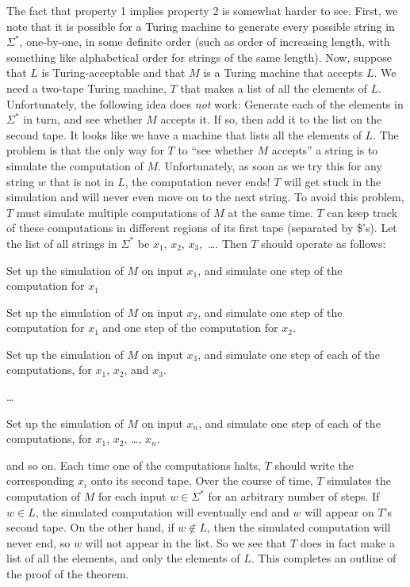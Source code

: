 The fact that property 1 implies property
2 is somewhat harder to see.  First, we note that it is possible for a Turing
machine to generate every possible string in $\Sigma^*$, one-by-one,
in some definite order (such
as order of increasing length, with something like alphabetical order
for strings of the same length).  Now, suppose that $L$ is Turing-acceptable
and that $M$ is a Turing machine that accepts $L$.  We need a two-tape
Turing machine, $T$ that makes a list of all the elements of $L$.
Unfortunately, the following idea does \textit{not} work:  Generate each
of the elements in $\Sigma^*$ in turn, and see whether $M$ accepts it.
If so, then add it to the list on the second tape.  It looks like we have a machine that
lists all the elements of $L$.  The problem is that the only way for $T$ to
``see whether $M$ accepts'' a string is to simulate the computation of $M$.
Unfortunately, as soon as we try this for any string $w$ that is not in $L$,
the computation never ends!  $T$ will get stuck in the simulation and will
never even move on to the next string.  To avoid this problem, $T$ must simulate
multiple computations of $M$ at the same time.  $T$ can keep track of
these computations in different regions of its first tape (separated by \$'s).
Let the list of all strings in $\Sigma^*$ be $x_1$, $x_2$, $x_3$,~\dots. Then $T$ should
operate as follows:

\smallskip
{}Set up the simulation of $M$ on input $x_1$, and simulate one 
          step of the computation for $x_1$

\smallskip
{}Set up the simulation of $M$ on input $x_2$, and simulate one 
          step of the computation for $x_1$ and one step of the computation for $x_2$.

\smallskip
{}Set up the simulation of $M$ on input $x_3$, and simulate one 
          step of each of the computations, for $x_1$, $x_2$, and $x_3$.

\smallskip
\IItem{}\dots
          
\smallskip
{}Set up the simulation of $M$ on input $x_n$, and simulate one 
          step of each of the computations, for $x_1$, $x_2$, \dots, $x_n$.

\noindent and so on.  Each time one of the computations halts, $T$ should
write the corresponding $x_i$ onto its second tape.  Over the course of
time, $T$ simulates the computation of $M$ for each input $w\in\Sigma^*$
for an arbitrary number of steps.  If $w\in L$, the simulated computation will
eventually end and $w$ will appear on $T$'s second tape.  On the other hand,
if $w\not\in L$, then the simulated computation will never end, so $w$ will
not appear in the list.  So we see that $T$ does in fact make a list of all
the elements, and only the elements of $L$.  This completes an outline of
the proof of the theorem.

